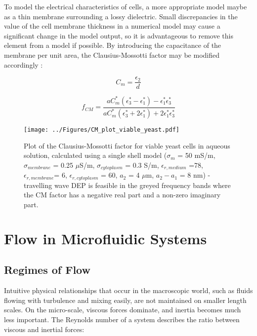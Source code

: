 To model the electrical characteristics of cells, a more appropriate model maybe as a thin membrane surrounding a lossy dielectric. Small discrepancies in the value of the cell membrane thickness in a numerical model may cause a significant change in the model output, so it is advantageous to remove this element from a model if possible. By introducing the capacitance of the membrane per unit area, the Clausius-Mossotti factor may be modified accordingly \citep{Kriegmaier:2001}:

\begin{equation}
 C_{m} = \frac{\epsilon_{2}}{d}
\end{equation}

\begin{equation}
 f_{CM}=\frac{aC_{m}^{*} \left ( \epsilon_{3}^{*} - \epsilon_{1}^{*}  \right ) - \epsilon_{1}^{*}\epsilon_{3}^{*}}{aC_{m}^{*} \left ( \epsilon_{3}^{*} +2 \epsilon_{1}^{*}  \right ) +2 \epsilon_{1}^{*}\epsilon_{3}^{*}}
\label{CM_thin_membrane}
\end{equation}

\begin{figure}
 \centering
 \texttt{[image: ../Figures/CM\_plot\_viable\_yeast.pdf]}
 \caption[Plot of the Clausius-Mossotti factor for viable yeast cells in aqueous solution.]{Plot of the Clausius-Mossotti factor for viable yeast cells in aqueous solution, calculated using a single shell model ($\sigma_{m}$ = 50 mS/m, $\sigma_{membrane}$ = 0.25 $\mu$S/m, $\sigma_{cytoplasm}$ = 0.3 S/m, $\epsilon_{r,medium}$ =78, $\epsilon_{r,membrane}$= 6, $\epsilon_{r,cytoplasm}$ = 60, $a_{2}$ = 4 $\mu$m, $a_{2}-a_{1}$ = 8 nm) - travelling wave DEP is feasible in the greyed frequency bands where the CM factor has a negative real part and a non-zero imaginary part.}
 \label{fig:CM_plot_viable_yeast}
\end{figure}


\section{Flow in Microfluidic Systems}
\label{sec:flow_in_microfluidic_systems}
\subsection{Regimes of Flow}

Intuitive physical relationships that occur in the macroscopic world, such as fluids flowing with turbulence and mixing easily, are not maintained on smaller length scales. On the micro-scale, viscous forces dominate, and inertia becomes much less important. The Reynolds number of a system describes the ratio between viscous and inertial forces:

